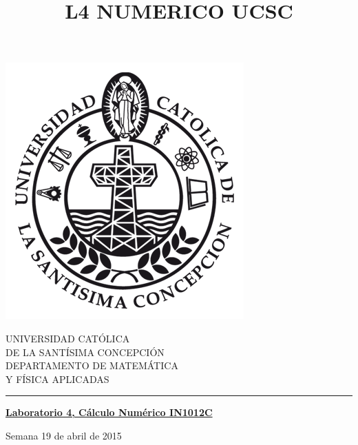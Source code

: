 \documentclass[11pt]{article}
\begin{document}
\title{L4 NUMERICO UCSC}

\begin{minipage}{0.15\textwidth}
\includegraphics[width=\textwidth]{ucsc.png}
\end{minipage}
\begin{minipage}{0.9\textwidth}
{UNIVERSIDAD CAT\'OLICA}\\ 
{DE LA SANT\'ISIMA CONCEPCI\'ON}\\
{DEPARTAMENTO DE MATEM\'ATICA}\\ 
{ Y F\'ISICA APLICADAS}\\
\rule{0.66\textwidth}{.5pt} %
\end{minipage}

\vspace*{0.5cm} \centerline {\bf\underline{Laboratorio 4, C\'alculo Num\'erico  IN1012C }}
\centerline{\textrm{Semana 19 de abril de 2015}}  \vspace{0.2cm}




\end{document}
